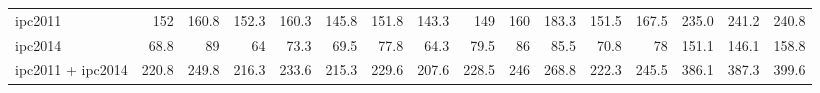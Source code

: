 \begin{center}
\begin{tabular}{lrrrrrrrrrrrrrrr}
ipc2011 & 152 & 160.8 & 152.3 & 160.3 & 145.8 & 151.8 & 143.3 & 149 & 160 & 183.3 & 151.5 & 167.5 & 235.0 & 241.2 & 240.8\\
ipc2014 & 68.8 & 89 & 64 & 73.3 & 69.5 & 77.8 & 64.3 & 79.5 & 86 & 85.5 & 70.8 & 78 & 151.1 & 146.1 & 158.8\\
ipc2011 + ipc2014 & 220.8 & 249.8 & 216.3 & 233.6 & 215.3 & 229.6 & 207.6 & 228.5 & 246 & 268.8 & 222.3 & 245.5 & 386.1 & 387.3 & 399.6\\
\end{tabular}
\end{center}
